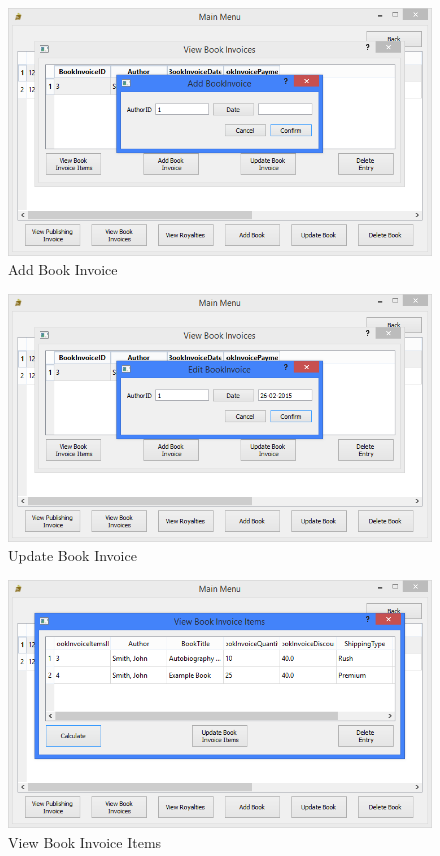 \begin{figure}[H]
    \caption{Add Book Invoice} \label{fig:AddBookInvoice}
    \includegraphics[width=\textwidth]{./Maintenance/UserInterface/AddBookInvoice.png}
\end{figure}

\begin{figure}[H]
    \caption{Update Book Invoice} \label{fig:UpdateBookInvoice}
    \includegraphics[width=\textwidth]{./Maintenance/UserInterface/UpdateBookInvoice.png}
\end{figure}

\begin{figure}[H]
    \caption{View Book Invoice Items} \label{fig:ViewBookInvoiceItems}
    \includegraphics[width=\textwidth]{./Maintenance/UserInterface/ViewBookInvoiceItems.png}
\end{figure}

